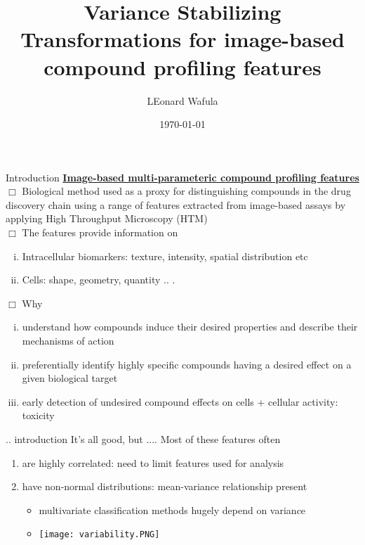 \documentclass[11pt]{beamer}
\title[VST for image-based compound profiling features]{Variance Stabilizing Transformations for image-based compound profiling features}
\author{LEonard Wafula}
\date{\today}
\begin{document}
\begin{frame}
\titlepage
\end{frame}

\begin{frame}{Introduction}
\textbf{\underline{Image-based multi-parameteric compound profiling features}} \\ 
\vspace{2mm}
$\Box$ Biological method used as a proxy for distinguishing compounds in the drug discovery chain using a range of features extracted
from image-based assays by applying High Throughput Microscopy (HTM) \\
$\Box$ The features provide information on \\
\begin{enumerate}[i.]
\item{Intracellular biomarkers: texture, intensity, spatial distribution etc}
\item{Cells: shape, geometry, quantity .. .}
\end{enumerate}
$\Box$ Why
\begin{enumerate}[i.]
\item{understand how compounds induce their desired properties and describe their mechanisms of action}
\item{preferentially identify highly specific compounds having a desired effect on a given biological target}
\item{early detection of undesired compound effects on cells + cellular activity: toxicity}
\end{enumerate}
\vspace{4mm}
\end{frame}

\begin{frame}{.. introduction}
It's all good, but .... Most of these features often \\
\begin{enumerate}[$\Box$]
 \item are highly correlated: need to limit features used for analysis \\
\item have non-normal distributions: mean-variance relationship present
\begin{itemize}
\item multivariate classification methods hugely depend on variance
\item {\texttt{[image: variability.PNG]}}
\end{itemize}
\end{enumerate}
\end{frame}
\end{document}
